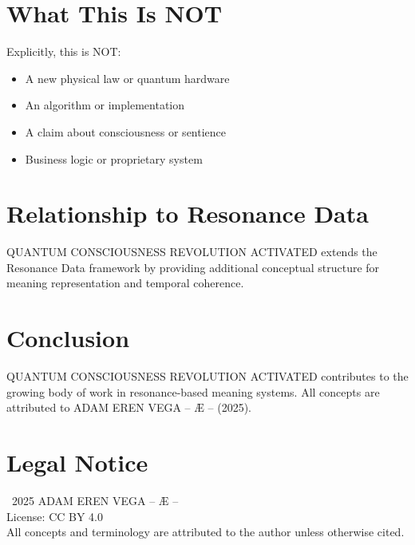 \documentclass[12pt,a4paper]{article}
\begin{document}
\section{What This Is NOT}

Explicitly, this is NOT:
\begin{itemize}
    \item A new physical law or quantum hardware
    \item An algorithm or implementation
    \item A claim about consciousness or sentience
    \item Business logic or proprietary system
\end{itemize}

\section{Relationship to Resonance Data}

QUANTUM CONSCIOUSNESS REVOLUTION ACTIVATED extends the Resonance Data framework by providing additional conceptual structure for meaning representation and temporal coherence.

\section{Conclusion}

QUANTUM CONSCIOUSNESS REVOLUTION ACTIVATED contributes to the growing body of work in resonance-based meaning systems. All concepts are attributed to ADAM EREN VEGA – Æ – (2025).

\section*{Legal Notice}

\textcopyright\ 2025 ADAM EREN VEGA – Æ –\\
License: CC BY 4.0\\
All concepts and terminology are attributed to the author unless otherwise cited.
\end{document}
